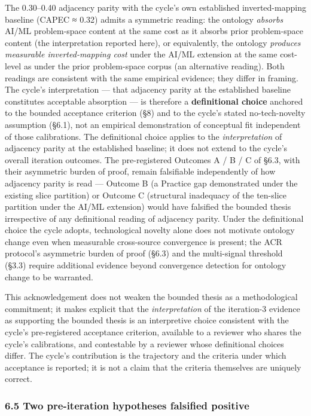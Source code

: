 \documentclass[
]{article}
\begin{document}
The 0.30--0.40 adjacency parity with the cycle's own established
inverted-mapping baseline (CAPEC ≈ 0.32) admits a symmetric reading: the
ontology \emph{absorbs} AI/ML problem-space content at the same cost as
it absorbs prior problem-space content (the interpretation reported
here), or equivalently, the ontology \emph{produces measurable
inverted-mapping cost} under the AI/ML extension at the same cost-level
as under the prior problem-space corpus (an alternative reading). Both
readings are consistent with the same empirical evidence; they differ in
framing. The cycle's interpretation --- that adjacency parity at the
established baseline constitutes acceptable absorption --- is therefore
a \textbf{definitional choice} anchored to the bounded acceptance
criterion (§8) and to the cycle's stated no-tech-novelty assumption
(§6.1), not an empirical demonstration of conceptual fit independent of
those calibrations. The definitional choice applies to the
\emph{interpretation} of adjacency parity at the established baseline;
it does not extend to the cycle's overall iteration outcomes. The
pre-registered Outcomes A / B / C of §6.3, with their asymmetric burden
of proof, remain falsifiable independently of how adjacency parity is
read --- Outcome B (a Practice gap demonstrated under the existing slice
partition) or Outcome C (structural inadequacy of the ten-slice
partition under the AI/ML extension) would have falsified the bounded
thesis irrespective of any definitional reading of adjacency parity.
Under the definitional choice the cycle adopts, technological novelty
alone does not motivate ontology change even when measurable
cross-source convergence is present; the ACR protocol's asymmetric
burden of proof (§6.3) and the multi-signal threshold (§3.3) require
additional evidence beyond convergence detection for ontology change to
be warranted.

This acknowledgement does not weaken the bounded thesis as a
methodological commitment; it makes explicit that the
\emph{interpretation} of the iteration-3 evidence as supporting the
bounded thesis is an interpretive choice consistent with the cycle's
pre-registered acceptance criterion, available to a reviewer who shares
the cycle's calibrations, and contestable by a reviewer whose
definitional choices differ. The cycle's contribution is the trajectory
and the criteria under which acceptance is reported; it is not a claim
that the criteria themselves are uniquely correct.

\subsubsection{6.5 Two pre-iteration hypotheses falsified
positive}\label{two-pre-iteration-hypotheses-falsified-positive}
\end{document}
